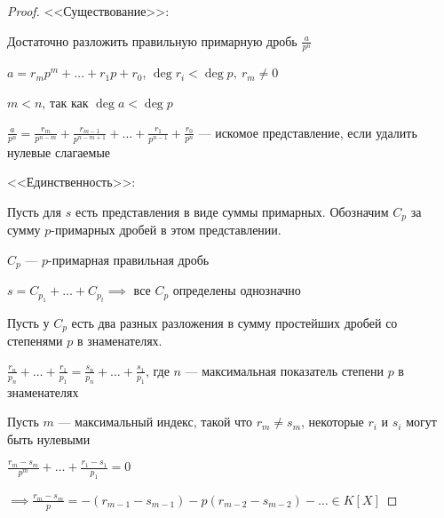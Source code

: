 \begin{proof}

    <<Существование>>:

    Достаточно разложить правильную примарную дробь $\frac{a}{p^n}$

    $a = r_mp^m + \ldots + r_1p + r_0$, $\deg r_i < \deg p,~r_m \neq 0$

    $m < n$, так как $\deg a < \deg p$

    $\frac{a}{p^n} = \frac{r_m}{p^{n - m}} + \frac{r_{m-1}}{p^{n - m + 1}} + \ldots + \frac{r_1}{p^{n - 1}} + \frac{r_0}{p^n}$ --- искомое представление, если удалить нулевые слагаемые

    <<Единственность>>:

    Пусть для $s$ есть представления в виде суммы примарных. Обозначим $C_p$ за сумму $p$-примарных дробей в этом представлении.

    $C_p$ --- $p$-примарная правильная дробь

    $s = C_{p_1} + \ldots + C_{p_t} \implies$ все $C_p$ определены однозначно
    
    Пусть у $C_p$ есть два разных разложения в сумму простейших дробей со степенями $p$ в знаменателях.

    $\frac{r_n}{p_n} + \ldots + \frac{r_1}{p_1} = \frac{s_n}{p_n} + \ldots + \frac{s_1}{p_1}$, где $n$ --- максимальная показатель степени $p$ в знаменателях

    Пусть $m$ --- максимальный индекс, такой что $r_m \neq s_m$, некоторые $r_i$ и $s_i$ могут быть нулевыми

    $\frac{r_m - s_m}{p^m} + \ldots + \frac{r_1 - s_1}{p_1} = 0$

    $\implies \frac{r_m - s_m}{p} = -(r_{m-1} - s_{m-1}) - p (r_{m-2} - s_{m-2}) - \ldots \in K[X]$
\end{proof}